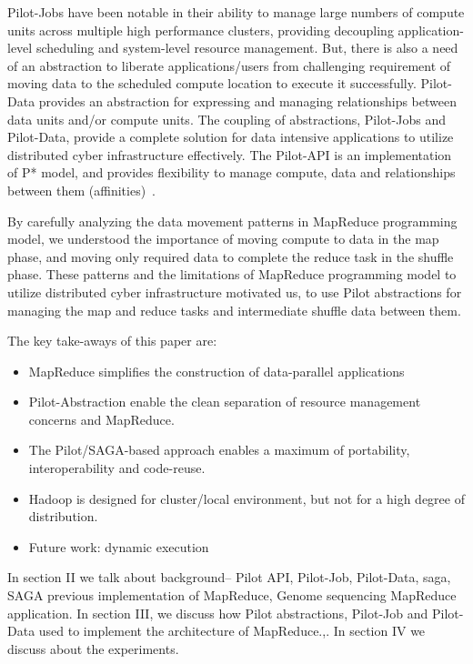 \documentclass{acm_proc_article-sp}
\begin{document}
Pilot-Jobs have been notable in their ability to manage large numbers of
compute units across multiple high performance clusters, providing decoupling
application-level scheduling and system-level resource management. But, there
is also a need of an abstraction to liberate applications/users from
challenging requirement of moving data to the scheduled compute location to
execute it successfully. Pilot-Data provides an abstraction for expressing and
managing relationships between data units and/or compute units. The coupling
of abstractions, Pilot-Jobs and Pilot-Data, provide a complete solution for
data intensive applications to utilize distributed cyber infrastructure
effectively. The Pilot-API is an implementation of P* model, and provides
flexibility to manage compute, data and relationships between them
(affinities)~\cite{pstar-2012}.


By carefully analyzing the data movement patterns in MapReduce programming
model, we understood the importance of moving compute to data in the map
phase, and moving only required data to complete the reduce task in the
shuffle phase. These patterns and the limitations of MapReduce programming
model to utilize distributed cyber infrastructure motivated us, to use Pilot
abstractions for managing the map and reduce tasks and intermediate shuffle
data between them.

The key take-aways of this paper are:
\begin{itemize}
	\item MapReduce simplifies the construction of data-parallel applications
	\item Pilot-Abstraction enable the clean separation of resource management concerns and MapReduce.
	\item The Pilot/SAGA-based approach enables a maximum of portability, interoperability and code-reuse.
	\item Hadoop is designed for cluster/local environment, but not for a high degree of distribution.
	\item Future work: dynamic execution
\end{itemize}

In section II we talk about background-- Pilot API, Pilot-Job, Pilot-Data,
saga, SAGA previous implementation of MapReduce, Genome sequencing MapReduce
application. In section III, we discuss how Pilot abstractions, Pilot-Job and
Pilot-Data used to implement the architecture of MapReduce.,. In section IV we
discuss about the experiments.
\end{document}
